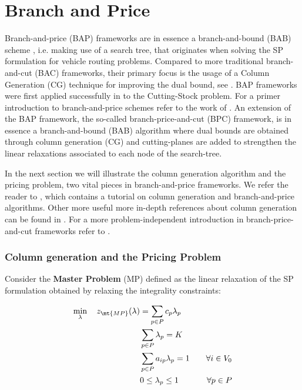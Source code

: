 \chapter{Branch and Price}
\label{sec:branch-and-price}

Branch-and-price (BAP) frameworks are in essence a branch-and-bound (BAB) scheme \parencite{land2010},
i.e. making use of a search tree,
that originates when solving the SP formulation for vehicle routing problems.
Compared to more traditional branch-and-cut (BAC) frameworks,
their primary focus is the usage of a Column Generation (CG) technique for improving the dual bound,
see \textcite{righini2008}.
BAP frameworks were first applied successfully in \textcite{gilmore1961} to the Cutting-Stock problem.
For a primer introduction to branch-and-price schemes refer to the work of \textcite{barnhart1998}.
An extension of the BAP framework, the so-called branch-price-and-cut (BPC) framework,
is in essence a branch-and-bound (BAB) algorithm where dual bounds are obtained through column generation (CG)
and cutting-planes are added to strengthen the linear relaxations associated to each node of the search-tree.

In the next section we will illustrate the column generation algorithm
and the pricing problem, two vital pieces in branch-and-price frameworks.
We refer the reader to \textcite{feillet2010}, which contains a tutorial
on column generation and branch-and-price algorithms.
Other more useful more in-depth references about column generation can be found in \textcite{desrosiers2005, lubbecke2005}.
For a more problem-independent introduction in branch-price-and-cut frameworks refer to \textcite{desrosiers2011}.

\subsection{Column generation and the Pricing Problem}
\label{sec:column-generation-and-pricing-problem}

Consider the \textbf{Master Problem} (MP) defined
as the linear relaxation of the SP formulation obtained by relaxing the integrality constraints:

\begin{align}
	\min_{\lambda} \quad z_\mt{MP}(\lambda) & = \sum_{p \in P}  c_p \lambda_p \label{eq:mp-obj-func}                                                                                                                             \\
	                                        & \sum_{p \in P} \lambda_{p} = K\label{eq:mp-K-routes}                                                                                                                               \\
	                                        & \sum_{p \in P}  a_{ip} \lambda_p = 1                   & \quad \forall i \in V_0                                              \label{eq:mp-customers-visited-by-exactly-one-route} \\
	                                        & 0 \le \lambda_p \le 1                                  & \quad \forall p \in P \label{eq:mp-lambda-mip-var-bounds}
\end{align}


